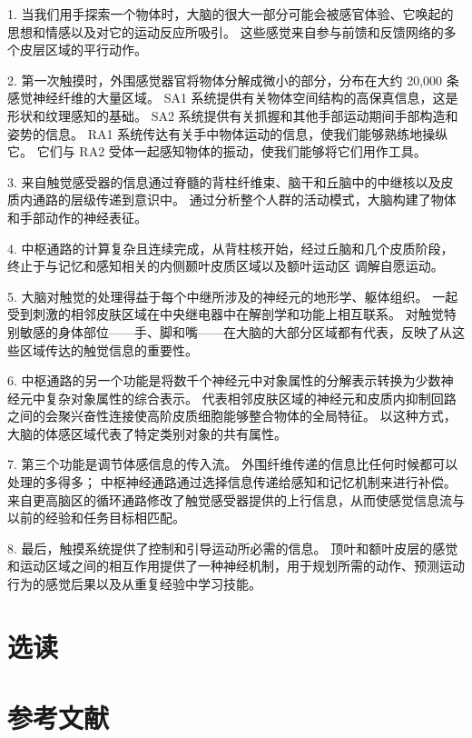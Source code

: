 1. 当我们用手探索一个物体时，大脑的很大一部分可能会被感官体验、它唤起的思想和情感以及对它的运动反应所吸引。 
这些感觉来自参与前馈和反馈网络的多个皮层区域的平行动作。 

2. 第一次触摸时，外围感觉器官将物体分解成微小的部分，分布在大约 20,000 条感觉神经纤维的大量区域。 
SA1 系统提供有关物体空间结构的高保真信息，这是形状和纹理感知的基础。 
SA2 系统提供有关抓握和其他手部运动期间手部构造和姿势的信息。 
RA1 系统传达有关手中物体运动的信息，使我们能够熟练地操纵它。 
它们与 RA2 受体一起感知物体的振动，使我们能够将它们用作工具。 


3. 来自触觉感受器的信息通过脊髓的背柱纤维束、脑干和丘脑中的中继核以及皮质内通路的层级传递到意识中。 
通过分析整个人群的活动模式，大脑构建了物体和手部动作的神经表征。 


4. 中枢通路的计算复杂且连续完成，从背柱核开始，经过丘脑和几个皮质阶段，终止于与记忆和感知相关的内侧颞叶皮质区域以及额叶运动区 调解自愿运动。 


5. 大脑对触觉的处理得益于每个中继所涉及的神经元的地形学、躯体组织。 
一起受到刺激的相邻皮肤区域在中央继电器中在解剖学和功能上相互联系。 
对触觉特别敏感的身体部位——手、脚和嘴——在大脑的大部分区域都有代表，反映了从这些区域传达的触觉信息的重要性。 


6. 中枢通路的另一个功能是将数千个神经元中对象属性的分解表示转换为少数神经元中复杂对象属性的综合表示。 
代表相邻皮肤区域的神经元和皮质内抑制回路之间的会聚兴奋性连接使高阶皮质细胞能够整合物体的全局特征。 
以这种方式，大脑的体感区域代表了特定类别对象的共有属性。 


7. 第三个功能是调节体感信息的传入流。 
外围纤维传递的信息比任何时候都可以处理的多得多； 中枢神经通路通过选择信息传递给感知和记忆机制来进行补偿。 
来自更高脑区的循环通路修改了触觉感受器提供的上行信息，从而使感觉信息流与以前的经验和任务目标相匹配。 


8. 最后，触摸系统提供了控制和引导运动所必需的信息。 
顶叶和额叶皮层的感觉和运动区域之间的相互作用提供了一种神经机制，用于规划所需的动作、预测运动行为的感觉后果以及从重复经验中学习技能。


\section{选读}
\section{参考文献}
